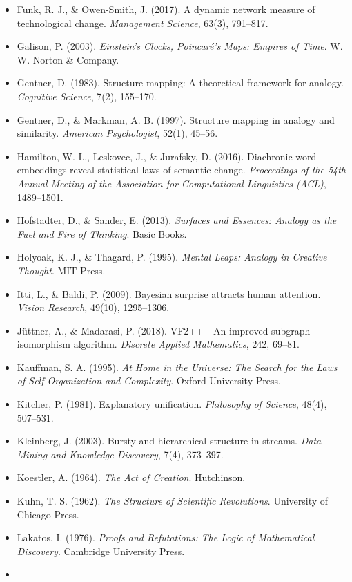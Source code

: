 \documentclass[a4paper,11pt]{article}
\begin{document}
\begin{itemize}
\item
  Funk, R. J., \& Owen-Smith, J. (2017). A dynamic network measure of
  technological change. \emph{Management Science}, 63(3), 791--817.
\item
  Galison, P. (2003). \emph{Einstein's Clocks, Poincaré's Maps: Empires
  of Time}. W. W. Norton \& Company.
\item
  Gentner, D. (1983). Structure-mapping: A theoretical framework for
  analogy. \emph{Cognitive Science}, 7(2), 155--170.
\item
  Gentner, D., \& Markman, A. B. (1997). Structure mapping in analogy
  and similarity. \emph{American Psychologist}, 52(1), 45--56.
\item
  Hamilton, W. L., Leskovec, J., \& Jurafsky, D. (2016). Diachronic word
  embeddings reveal statistical laws of semantic change.
  \emph{Proceedings of the 54th Annual Meeting of the Association for
  Computational Linguistics (ACL)}, 1489--1501.
\item
  Hofstadter, D., \& Sander, E. (2013). \emph{Surfaces and Essences:
  Analogy as the Fuel and Fire of Thinking}. Basic Books.
\item
  Holyoak, K. J., \& Thagard, P. (1995). \emph{Mental Leaps: Analogy in
  Creative Thought}. MIT Press.
\item
  Itti, L., \& Baldi, P. (2009). Bayesian surprise attracts human
  attention. \emph{Vision Research}, 49(10), 1295--1306.
\item
  Jüttner, A., \& Madarasi, P. (2018). VF2++---An improved subgraph
  isomorphism algorithm. \emph{Discrete Applied Mathematics}, 242,
  69--81.
\item
  Kauffman, S. A. (1995). \emph{At Home in the Universe: The Search for
  the Laws of Self-Organization and Complexity}. Oxford University
  Press.
\item
  Kitcher, P. (1981). Explanatory unification. \emph{Philosophy of
  Science}, 48(4), 507--531.
\item
  Kleinberg, J. (2003). Bursty and hierarchical structure in streams.
  \emph{Data Mining and Knowledge Discovery}, 7(4), 373--397.
\item
  Koestler, A. (1964). \emph{The Act of Creation}. Hutchinson.
\item
  Kuhn, T. S. (1962). \emph{The Structure of Scientific Revolutions}.
  University of Chicago Press.
\item
  Lakatos, I. (1976). \emph{Proofs and Refutations: The Logic of
  Mathematical Discovery}. Cambridge University Press.
\item

\end{itemize}
\end{document}
